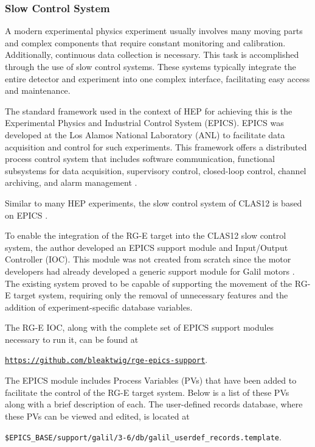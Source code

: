 \subsubsection{Slow Control System}
\label{sssec::slow_control_system}
    A modern experimental physics experiment usually involves many moving parts and complex components that require constant monitoring and calibration.
    Additionally, continuous data collection is necessary.
    This task is accomplished through the use of slow control systems.
    These systems typically integrate the entire detector and experiment into one complex interface, facilitating easy access and maintenance.

    The standard framework used in the context of HEP for achieving this is the Experimental Physics and Industrial Control System (EPICS).
    EPICS was developed at the Los Alamos National Laboratory (ANL) to facilitate data acquisition and control for such experiments.
    This framework offers a distributed process control system that includes software communication, functional subsystems for data acquisition, supervisory control, closed-loop control, channel archiving, and alarm management \cite{dalesio1991}.

    Similar to many HEP experiments, the slow control system of CLAS12 is based on EPICS \cite{boyarinov2020}.

    To enable the integration of the RG-E target into the CLAS12 slow control system, the author developed an EPICS support module and Input/Output Controller (IOC).
    This module was not created from scratch since the motor developers had already developed a generic support module for Galil motors \cite{farnswort2009}.
    The existing system proved to be capable of supporting the movement of the RG-E target system, requiring only the removal of unnecessary features and the addition of experiment-specific database variables.

    The RG-E IOC, along with the complete set of EPICS support modules necessary to run it, can be found at

    \begin{center}
        \hyperlink{https://github.com/bleaktwig/rge-epics-support}{\texttt{https://github.com/bleaktwig/rge-epics-support}}.
    \end{center}

    The EPICS module includes Process Variables (PVs) that have been added to facilitate the control of the RG-E target system.
    Below is a list of these PVs along with a brief description of each.
    The user-defined records database, where these PVs can be viewed and edited, is located at

    \begin{center}
        \texttt{\$EPICS\_BASE/support/galil/3-6/db/galil\_userdef\_records.template}.
    \end{center}

    
    
    
